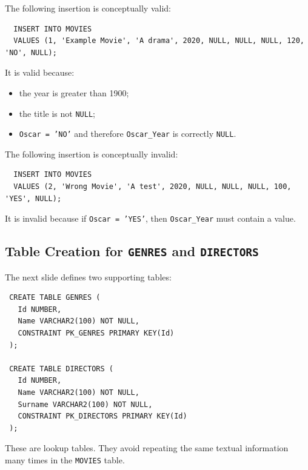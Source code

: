  \begin{example}
  The following insertion is conceptually valid:
  \begin{verbatim}
  INSERT INTO MOVIES
  VALUES (1, 'Example Movie', 'A drama', 2020, NULL, NULL, NULL, 120, 'NO', NULL);
  \end{verbatim}
  \vspace{-0.4cm}

  It is valid because:
  \begin{itemize}
   \item the year is greater than 1900;
   \vspace{0.2cm}
   \item the title is not \texttt{NULL};
   \vspace{0.2cm}
   \item \texttt{Oscar = 'NO'} and therefore \texttt{Oscar\_Year} is correctly \texttt{NULL}.
  \end{itemize}
 \end{example}

 \begin{example}
  The following insertion is conceptually invalid:
  \begin{verbatim}
  INSERT INTO MOVIES
  VALUES (2, 'Wrong Movie', 'A test', 2020, NULL, NULL, NULL, 100, 'YES', NULL);
  \end{verbatim}
  \vspace{-0.4cm}

  It is invalid because if \texttt{Oscar = 'YES'}, then \texttt{Oscar\_Year} must contain a value.
 \end{example}

 \subsection{Table Creation for \texttt{GENRES} and \texttt{DIRECTORS}}

 The next slide defines two supporting tables:

 \begin{verbatim}
 CREATE TABLE GENRES (
   Id NUMBER,
   Name VARCHAR2(100) NOT NULL,
   CONSTRAINT PK_GENRES PRIMARY KEY(Id)
 );

 CREATE TABLE DIRECTORS (
   Id NUMBER,
   Name VARCHAR2(100) NOT NULL,
   Surname VARCHAR2(100) NOT NULL,
   CONSTRAINT PK_DIRECTORS PRIMARY KEY(Id)
 );
 \end{verbatim}
 \vspace{-0.4cm}

 These are lookup tables. They avoid repeating the same textual information many times in the \texttt{MOVIES} table.

